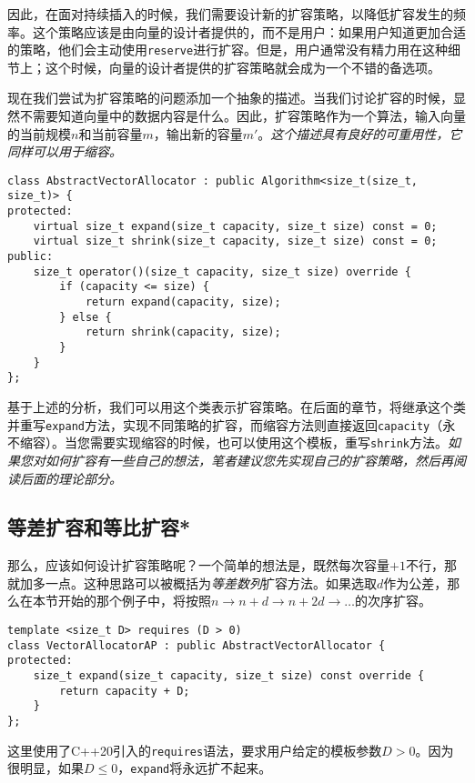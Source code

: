 因此，在面对持续插入的时候，我们需要设计新的扩容策略，以降低扩容发生的频率。这个策略应该是由向量的设计者提供的，而不是用户：如果用户知道更加合适的策略，他们会主动使用\lstinline{reserve}进行扩容。但是，用户通常没有精力用在这种细节上；这个时候，向量的设计者提供的扩容策略就会成为一个不错的备选项。

现在我们尝试为扩容策略的问题添加一个抽象的描述。当我们讨论扩容的时候，显然不需要知道向量中的数据内容是什么。因此，扩容策略作为一个算法，输入向量的当前规模$n$和当前容量$m$，输出新的容量$m'$。\textit{这个描述具有良好的可重用性，它同样可以用于缩容。}

\begin{lstlisting}
class AbstractVectorAllocator : public Algorithm<size_t(size_t, size_t)> {
protected:
    virtual size_t expand(size_t capacity, size_t size) const = 0;
    virtual size_t shrink(size_t capacity, size_t size) const = 0;
public:
    size_t operator()(size_t capacity, size_t size) override {
        if (capacity <= size) {
            return expand(capacity, size);
        } else {
            return shrink(capacity, size);
        }
    }
};
\end{lstlisting}

基于上述的分析，我们可以用这个类表示扩容策略。在后面的章节，将继承这个类并重写\lstinline{expand}方法，实现不同策略的扩容，而缩容方法则直接返回\lstinline{capacity}（永不缩容）。当您需要实现缩容的时候，也可以使用这个模板，重写\lstinline{shrink}方法。\textit{如果您对如何扩容有一些自己的想法，笔者建议您先实现自己的扩容策略，然后再阅读后面的理论部分。}

\subsection{等差扩容和等比扩容*}
\label{sec:等差和等比}
那么，应该如何设计扩容策略呢？一个简单的想法是，既然每次容量$+1$不行，那就加多一点。这种思路可以被概括为\textit{等差数列}扩容方法。如果选取$d$作为公差，那么在本节开始的那个例子中，将按照$n\to n+d \to n+2d \to \dots$的次序扩容。

\begin{lstlisting}
template <size_t D> requires (D > 0)
class VectorAllocatorAP : public AbstractVectorAllocator {
protected:
    size_t expand(size_t capacity, size_t size) const override {
        return capacity + D;
    }
};
\end{lstlisting}

这里使用了C++20引入的\lstinline{requires}语法，要求用户给定的模板参数$D>0$。因为很明显，如果$D\le 0$，\lstinline{expand}将永远扩不起来。

